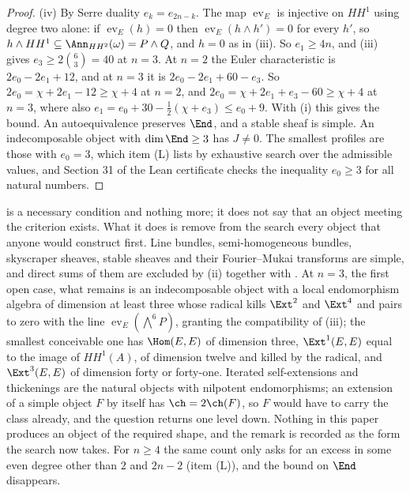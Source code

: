 \begin{proof}
(iv) By Serre duality $e_{k}=e_{2n-k}$. The map $\operatorname{ev}_{E}$ is
injective on $HH^{1}$ using degree two alone: if $\operatorname{ev}_{E}(h)=0$
then $\operatorname{ev}_{E}(h\wedge h')=0$ for every $h'$, so
$h\wedge HH^{1}\subseteq\Ann_{HH^{2}}(\omega)=P\wedge Q$, and $h=0$ as in
(iii). So $e_{1}\ge4n$, and (iii) gives
$e_{3}\ge2\binom{6}{3}=40$ at $n=3$. At $n=2$ the Euler
characteristic is $2e_{0}-2e_{1}+12$, and at $n=3$ it is
$2e_{0}-2e_{1}+60-e_{3}$. So $2e_{0}=\chi+2e_{1}-12\ge\chi+4$ at $n=2$, and
$2e_{0}=\chi+2e_{1}+e_{3}-60\ge\chi+4$ at $n=3$, where also
$e_{1}=e_{0}+30-\frac12(\chi+e_{3})\le e_{0}+9$. With (i) this gives the
bound. An autoequivalence preserves $\End$, and a stable sheaf is simple.
An indecomposable object with $\dim\End\ge3$ has $J\ne0$. The smallest
profiles are those with $e_{0}=3$, which item (L) lists by exhaustive search
over the admissible values, and Section 31 of the Lean certificate checks the
inequality $e_{0}\ge3$ for all natural numbers.
\end{proof}

\begin{remark}\label{rem:p2endo}
 is a necessary condition and nothing more; it does not say
that an object meeting the criterion exists. What it does is remove from the
search every object that anyone would construct first. Line bundles,
semi-homogeneous bundles, skyscraper sheaves, stable sheaves and their
Fourier--Mukai transforms are simple, and direct sums of them are excluded by
(ii) together with . At $n=3$, the first open case, what
remains is an indecomposable object with a local endomorphism algebra of
dimension at least three whose radical kills $\Ext^{2}$ and $\Ext^{4}$ and
pairs to zero with the line $\operatorname{ev}_{E}(\bigwedge^{6}P)$,
granting the compatibility of (iii); the smallest
conceivable one has $\Hom(E,E)$ of dimension three, $\Ext^{1}(E,E)$
equal to the image of $HH^{1}(A)$, of dimension twelve and killed by the
radical, and $\Ext^{3}(E,E)$ of dimension forty or forty-one. Iterated
self-extensions and thickenings are the natural objects with nilpotent
endomorphisms; an extension of a simple object $F$ by itself has
$\ch=2\ch(F)$, so $F$ would have to carry the class already, and the question
returns one level down. Nothing in this paper produces an object of the
required shape, and the remark is recorded as the form the search now takes.
For $n\ge4$ the same count only asks for an excess in some even degree other
than $2$ and $2n-2$ (item (L)), and the bound on $\End$ disappears.
\end{remark}

